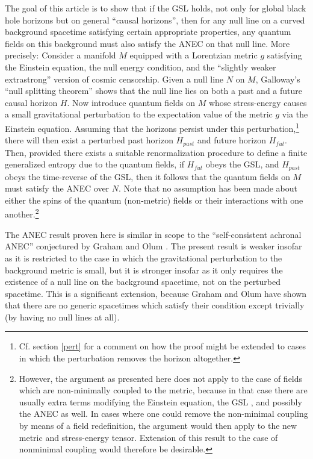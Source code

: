\documentclass[11pt]{article}
\begin{document}
The goal of this article is to show that if the GSL holds, not only for global black hole horizons but on general ``causal horizons'', then for any null line on a curved background spacetime satisfying certain appropriate properties, any quantum fields on this background must also satisfy the ANEC on that null line.  More precisely: Consider a manifold $M$ equipped with a Lorentzian metric $g$ satisfying the Einstein equation, the null energy condition, and the ``slightly weaker extrastrong'' \cite{penrose99} version of cosmic censorship.  Given a null line $N$ on $M$, Galloway's ``null splitting theorem'' \cite{galloway00} shows that the null line lies on both a past and a future causal horizon $H$.  Now introduce quantum fields on $M$ whose stress-energy causes a small gravitational perturbation to the expectation value of the metric $g$ via the Einstein equation.  Assuming that the horizons persist under this perturbation,\footnote{Cf. section \ref{pert} for a comment on how the proof might be extended to cases in which the perturbation removes the horizon altogether.} there will then exist a perturbed past horizon $H_{past}$ and future horizon $H_{fut}$.  Then, provided there exists a suitable renormalization procedure to  define a finite generalized entropy due to the quantum fields, if $H_{fut}$ obeys the GSL, and $H_{past}$ obeys the time-reverse of the GSL, then it follows that the quantum fields on $M$ must satisfy the ANEC over $N$.  Note that no assumption has been made about either the spins of the quantum (non-metric) fields or their interactions with one another.\footnote{However, the argument as presented here does not apply to the case of fields which are non-minimally coupled to the metric, because in that case there are usually extra terms modifying the Einstein equation, the GSL \cite{wald93}, and possibly the ANEC as well.  In cases where one could remove the non-minimal coupling by means of a field redefinition, the argument would then apply to the new metric and stress-energy tensor.  Extension of this result to the case of nonminimal coupling would therefore be desirable.}

The ANEC result proven here is similar in scope to the ``self-consistent achronal ANEC'' conjectured by Graham and Olum \cite{GO07}.  The present result is weaker insofar as it is restricted to the case in which the gravitational perturbation to the background metric is small, but it is stronger insofar as it only requires the existence of a null line on the background spacetime, not on the perturbed spacetime.  This is a significant extension, because Graham and Olum have shown that there are no generic spacetimes which satisfy their condition except trivially (by having no null lines at all).
\end{document}
